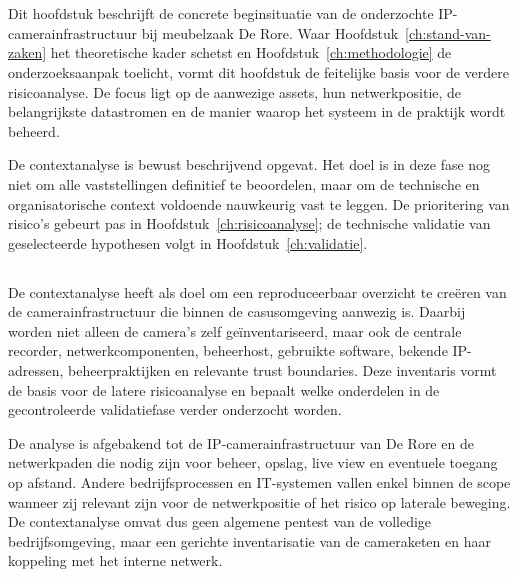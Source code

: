 
\chapter{}%
\label{ch:contextanalyse}

Dit hoofdstuk beschrijft de concrete beginsituatie van de onderzochte IP-camerainfrastructuur bij meubelzaak De Rore. Waar Hoofdstuk~\ref{ch:stand-van-zaken} het theoretische kader schetst en Hoofdstuk~\ref{ch:methodologie} de onderzoeksaanpak toelicht, vormt dit hoofdstuk de feitelijke basis voor de verdere risicoanalyse. De focus ligt op de aanwezige assets, hun netwerkpositie, de belangrijkste datastromen en de manier waarop het systeem in de praktijk wordt beheerd.

De contextanalyse is bewust beschrijvend opgevat. Het doel is in deze fase nog niet om alle vaststellingen definitief te beoordelen, maar om de technische en organisatorische context voldoende nauwkeurig vast te leggen. De prioritering van risico's gebeurt pas in Hoofdstuk~\ref{ch:risicoanalyse}; de technische validatie van geselecteerde hypothesen volgt in Hoofdstuk~\ref{ch:validatie}.

\section{}%
\label{sec:context-doel}

De contextanalyse heeft als doel om een reproduceerbaar overzicht te creëren van de camerainfrastructuur die binnen de casusomgeving aanwezig is. Daarbij worden niet alleen de camera's zelf geïnventariseerd, maar ook de centrale recorder, netwerkcomponenten, beheerhost, gebruikte software, bekende IP-adressen, beheerpraktijken en relevante trust boundaries. Deze inventaris vormt de basis voor de latere risicoanalyse en bepaalt welke onderdelen in de gecontroleerde validatiefase verder onderzocht worden.

De analyse is afgebakend tot de IP-camerainfrastructuur van De Rore en de netwerkpaden die nodig zijn voor beheer, opslag, live view en eventuele toegang op afstand. Andere bedrijfsprocessen en IT-systemen vallen enkel binnen de scope wanneer zij relevant zijn voor de netwerkpositie of het risico op laterale beweging. De contextanalyse omvat dus geen algemene pentest van de volledige bedrijfsomgeving, maar een gerichte inventarisatie van de cameraketen en haar koppeling met het interne netwerk.

